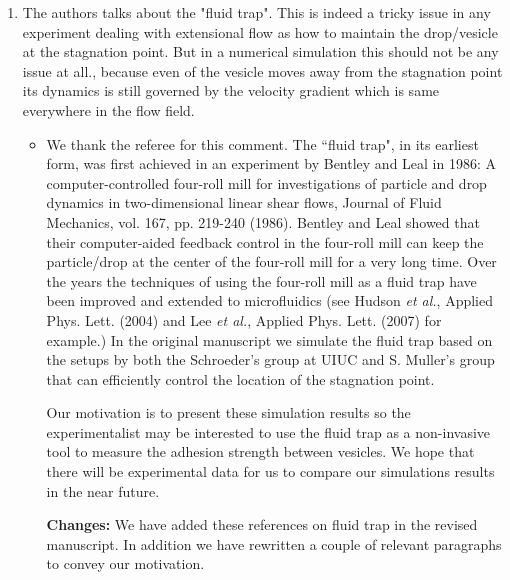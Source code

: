 \documentclass[11pt]{article}
\newcommand{\comment}[1]{{\color{blue} #1}}
\begin{document}
\begin{enumerate}
\noindent
\item\comment{The authors talks about the "fluid trap". This is indeed a tricky
issue in any experiment dealing with extensional flow as how to
maintain the drop/vesicle at the stagnation point. But in a numerical
simulation this should not be any issue at all., because even of the
vesicle moves away from the stagnation point its dynamics is still
governed by the velocity gradient which is same everywhere in the flow
field.}
\begin{itemize}
  \item We thank the referee for this comment. The ``fluid trap", in its earliest form, was first achieved in an experiment by Bentley and Leal in 1986: A computer-controlled four-roll mill for
  investigations  of particle and drop dynamics in two-dimensional linear shear flows, Journal of Fluid Mechanics, vol. 167, pp. 219-240 (1986).  Bentley and Leal showed that their computer-aided feedback control in the four-roll mill can keep the particle/drop at the center of the four-roll mill for a very long time.
  Over the years the techniques of using the four-roll mill as a fluid trap have been improved and extended to microfluidics (see Hudson {\it et al.}, Applied Phys. Lett. (2004) and Lee {\it et al.}, Applied Phys. Lett. (2007) for example.)
  In the original manuscript we simulate the fluid trap based on the setups by both the Schroeder's group at UIUC and S. Muller's group that can efficiently control the location of the stagnation point. 
  
  Our motivation is to present these simulation results so the experimentalist may be interested to use the fluid trap as a non-invasive tool to measure the adhesion strength between vesicles. We hope that there will be experimental data for us to compare our simulations results in the near future.
  
   \noindent
  {\bf Changes:} We have added these references on fluid trap in the revised manuscript. In addition we have rewritten a couple of relevant paragraphs to convey our motivation.
 \end{itemize}



\end{enumerate}
\end{document}
